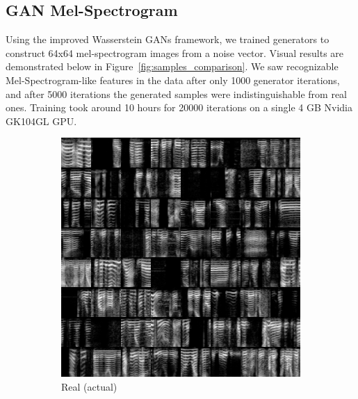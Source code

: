 \subsection{GAN Mel-Spectrogram}
Using the improved Wasserstein GANs framework, we trained generators to
construct 64x64 mel-spectrogram images from a noise vector. Visual results are demonstrated below in Figure~\ref{fig:samples_comparison}.   We saw recognizable Mel-Spectrogram-like features in the
data after only 1000 generator iterations, and after 5000 iterations the generated samples were indistinguishable from real ones. Training took around 10
hours for 20000 iterations on a single 4 GB Nvidia GK104GL GPU.
\begin{figure}[h]
    \centering
    \begin{subfigure}[b]{0.4\textwidth}
        \includegraphics[width=\textwidth]{./fig/samples_groundtruth.png}
        \caption{Real (actual)}
        \label{fig:samples_real}
    \end{subfigure}
    \qquad
    \begin{subfigure}[b]{0.4\textwidth}

\end{subfigure}
\end{figure}
